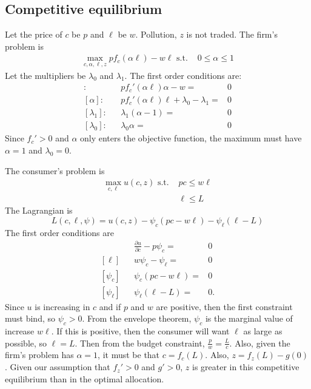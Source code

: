 \documentclass[12pt,reqno]{amsart}
\theoremstyle{definition}
\begin{document}
\subsection{Competitive equilibrium}

Let the price of $c$ be $p$ and $\ell$ be $w$. Pollution, $z$ is not
traded. The firm's problem is
\begin{align*}
  \max_{c,\alpha,\ell,z} p f_c(\alpha \ell) - w \ell \text{ s.t. } & 0
  \leq \alpha \leq 1 
\end{align*}
Let the multipliers be $\lambda_0$ and $\lambda_1$. The first order conditions are: 
\begin{align*} 
  [\ell]: & & p f_c'(\alpha \ell) \alpha - w = & 0 \\
  [\alpha]: & & p f_c'(\alpha \ell) \ell + \lambda_{0} -
  \lambda_{1} = & 0 \\ 
  [\lambda_{1}]: && \lambda_{1}(\alpha -1) = & 0 \\
  [\lambda_{0}]: && \lambda_{0}\alpha = & 0 
\end{align*}
Since $f_c'>0$ and $\alpha$ only enters the objective function, the
maximum must have $\alpha = 1$ and $\lambda_0 = 0$. 

The consumer's problem is
\begin{align*}
  \max_{c,\ell} u(c,z) \text{ s.t. } & pc \leq w \ell \\
  & \ell \leq L 
\end{align*}
The Lagrangian is
\[ L(c,\ell,\psi) = u(c,z) - \psi_c(pc - w\ell) - \psi_\ell (\ell -L) \]
The first order conditions are
\begin{align*}
  [c]&& \frac{\partial u}{\partial c} - p \psi_c = & 0 \\
  [\ell]&&  w \psi_c - \psi_\ell = & 0 \\
  [\psi_c]&& \psi_c(pc-w\ell) = & 0 \\
  [\psi_\ell] && \psi_\ell(\ell-L) = & 0.
\end{align*}
Since $u$ is increasing in $c$ and if $p$ and $w$ are positive, then
the first constraint must bind, so $\psi_c>0$. From the envelope
theorem, $\psi_c$ is the marginal value of increase $w\ell$. If this
is positive, then the consumer will want $\ell$ as large as possible,
so $\ell = L$. Then from the budget constraint, $\frac{p}{w} =
\frac{L}{c}$. Also, given the firm's problem has $\alpha=1$, it must
be that $c = f_c(L)$. Also, $z = f_z(L) - g(0)$. Given our assumption
that $f_z'>0$ and $g'>0$, $z$ is greater in this competitive
equilibrium than in the optimal allocation.
\end{document}
